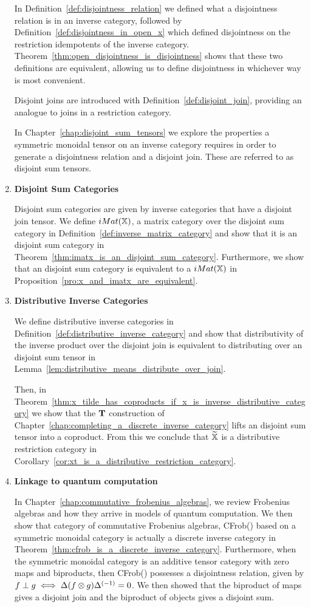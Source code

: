 \begin{enumerate}
In Definition~\ref{def:disjointness_relation} we defined what a disjointness relation is in an
inverse category, followed by Definition~\ref{def:disjointness_in_open_x} which defined disjointness
on the restriction idempotents of the inverse
category. Theorem~\ref{thm:open_disjointness_is_disjointness} shows that these two definitions are
equivalent, allowing us to define disjointness in whichever way is most convenient.

Disjoint joins are introduced with Definition~\ref{def:disjoint_join}, providing an analogue to
joins in a restriction category.

In Chapter~\ref{chap:disjoint_sum_tensors} we explore the properties a symmetric monoidal tensor
on an inverse category requires in order to generate a disjointness relation and a disjoint
join. These are referred to as disjoint sum tensors.

\item \textbf{Disjoint Sum Categories}

Disjoint sum categories are given by inverse categories that have a disjoint join tensor. We define
$iMat({\mathbb{X}})$, a matrix category over the disjoint sum category \X in
Definition~\ref{def:inverse_matrix_category} and show that it is an disjoint sum category in
Theorem~\ref{thm:imatx_is_an_disjoint_sum_category}. Furthermore, we show
that an disjoint sum category \X is equivalent to a $iMat({\mathbb{X}})$ in
Proposition~\ref{pro:x_and_imatx_are_equivalent}.


\item \textbf{Distributive Inverse Categories}

We define distributive inverse categories in Definition~\ref{def:distributive_inverse_category} and
show that distributivity of the inverse product over the disjoint join is equivalent to distributing
over an disjoint sum tensor in Lemma~\ref{lem:distributive_means_distribute_over_join}.

Then, in Theorem~\ref{thm:x_tilde_has_coproducts_if_x_is_inverse_distributive_category} we show that
the $\mathbf{T}$ construction of Chapter~\ref{chap:completing_a_discrete_inverse_category} lifts an disjoint sum
tensor into a coproduct. From this we conclude that $\widetilde{\mathbb{X}}$ is a distributive restriction category in
Corollary~\ref{cor:xt_is_a_distributive_restriction_category}.

\item \textbf{Linkage to quantum computation}

In Chapter~\ref{chap:commutative_frobenius_algebras}, we review Frobenius algebras and how they
arrive in models of quantum computation. We then show that category of commutative Frobenius
algebras, CFrob(\X) based on a symmetric monoidal category \X is actually a discrete inverse category in
Theorem~\ref{thm:cfrob_is_a_discrete_inverse_category}. Furthermore, when the symmetric monoidal
category \X is an additive tensor category with zero maps and biproducts, then CFrob(\X) possesses a
disjointness relation, given by  $f\perp g \iff \Delta(f\otimes g){\Delta}^{(-1)} = 0$. We then showed that
the biproduct of maps gives a  disjoint join and the biproduct of objects gives a disjoint sum.


\end{enumerate}
